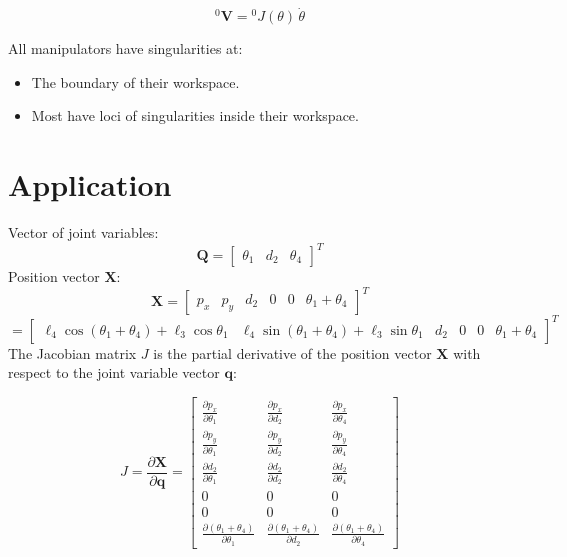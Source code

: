 \[
{}^0\mathbf{V} = {}^0\!J(\theta) \, \dot{\theta}
\]

All manipulators have singularities at:
\begin{itemize}
    \item The boundary of their workspace.
    \item Most have loci of singularities inside their workspace.
\end{itemize}
\section{Application}
Vector of joint variables:
\[
\mathbf{Q} = \begin{bmatrix} \theta_1 & d_2 & \theta_4 \end{bmatrix}^T
\]
Position vector $\mathbf{X}$:
\[
\mathbf{X} = \begin{bmatrix} p_x & p_y & d_2 & 0 & 0 & \theta_1 + \theta_4 \end{bmatrix}^T
\]
\[
= \begin{bmatrix} 
\ell_4 \cos(\theta_1 + \theta_4) + \ell_3 \cos \theta_1 & 
\ell_4 \sin(\theta_1 + \theta_4) + \ell_3 \sin \theta_1 & 
d_2 & 
0 & 
0 & 
\theta_1 + \theta_4 
\end{bmatrix}^T
\]
The Jacobian matrix $J$ is the partial derivative of the position vector $\mathbf{X}$ with respect to the joint variable vector $\mathbf{q}$:

\[
J = \frac{\partial \mathbf{X}}{\partial \mathbf{q}} =
\begin{bmatrix}
\frac{\partial p_x}{\partial \theta_1} & \frac{\partial p_x}{\partial d_2} & \frac{\partial p_x}{\partial \theta_4} \\
\frac{\partial p_y}{\partial \theta_1} & \frac{\partial p_y}{\partial d_2} & \frac{\partial p_y}{\partial \theta_4} \\
\frac{\partial d_2}{\partial \theta_1} & \frac{\partial d_2}{\partial d_2} & \frac{\partial d_2}{\partial \theta_4} \\
0 & 0 & 0 \\
0 & 0 & 0 \\
\frac{\partial (\theta_1 + \theta_4)}{\partial \theta_1} & \frac{\partial (\theta_1 + \theta_4)}{\partial d_2} & \frac{\partial (\theta_1 + \theta_4)}{\partial \theta_4}
\end{bmatrix}
\]

